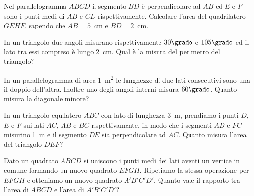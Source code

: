 \begin{multicols}{2}
\begin{esercizio}
\label{ese:7.109}
Nel parallelogramma $ABCD$ il segmento $BD$ è perpendicolare ad $AB$ 
ed $E$ e $F$ sono i punti medi di $AB$ e $CD$ rispettivamente. 
Calcolare l'area del quadrilatero $GEHF$, sapendo che $AB=5$~cm e 
$BD=2$~cm.
\end{esercizio}

%

\begin{esercizio}
\label{ese:7.110}
In un triangolo due angoli misurano rispettivamente $30\grado$ e 
$105\grado$ ed il lato tra essi compreso è lungo 2~cm. Qual è la 
misura del perimetro del triangolo? 
\end{esercizio}

\begin{esercizio}
\label{ese:7.111}
In un parallelogramma di area 1~m\textsuperscript{2} le lunghezze di 
due lati consecutivi sono una il doppio dell'altra. Inoltre uno degli 
angoli interni misura $60\grado$. Quanto misura la diagonale minore?
\end{esercizio}

\begin{esercizio}
\label{ese:7.112}
In un triangolo equilatero $ABC$ con lato di lunghezza 3~m, prendiamo 
i punti $D$, $E$ e $F$ sui lati $AC$, $AB$ e $BC$ rispettivamente, in 
modo che i segmenti $AD$ e $FC$ misurino 1~m e il segmento $DE$ sia 
perpendicolare ad $AC$. Quanto misura l'area del triangolo $DEF$?
\end{esercizio}

%

\begin{esercizio}
\label{ese:7.113}
Dato un quadrato $ABCD$ si uniscono i punti medi dei lati aventi un 
vertice in comune formando un nuovo quadrato $EFGH$. Ripetiamo la 
stessa operazione per $EFGH$ e otteniamo un nuovo quadrato 
$A'B'C'D'$. Quanto vale il rapporto tra l'area di $ABCD$ e l'area di 
$A'B'C'D'$?
\end{esercizio}

\end{multicols}


